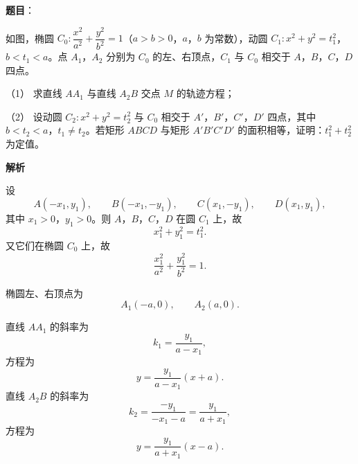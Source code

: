 \begin{answer}

\textbf{题目}：

如图，椭圆 $C_0:\dfrac{x^2}{a^2}+\dfrac{y^2}{b^2}=1$（$a>b>0$，$a$，$b$ 为常数），动圆 $C_1:x^2+y^2=t_1^2$，$b<t_1<a$。点 $A_1$，$A_2$ 分别为 $C_0$ 的左、右顶点，$C_1$ 与 $C_0$ 相交于 $A$，$B$，$C$，$D$ 四点。
\nopagebreak[4]
\begin{center}\end{center}
\nopagebreak[4]
（1） 求直线 $AA_1$ 与直线 $A_2B$ 交点 $M$ 的轨迹方程；

（2） 设动圆 $C_2:x^2+y^2=t_2^2$ 与 $C_0$ 相交于 $A'$，$B'$，$C'$，$D'$ 四点，其中 $b<t_2<a$，$t_1\neq t_2$。若矩形 $ABCD$ 与矩形 $A'B'C'D'$ 的面积相等，证明：$t_1^2+t_2^2$ 为定值。

\textbf{解析}


设
\nopagebreak[4]
\[A(-x_1,y_1),\qquad B(-x_1,-y_1),\qquad C(x_1,-y_1),\qquad D(x_1,y_1),\]
其中 $x_1>0$，$y_1>0$。则 $A$，$B$，$C$，$D$ 在圆 $C_1$ 上，故
\nopagebreak[4]
\[x_1^2+y_1^2=t_1^2.\]
又它们在椭圆 $C_0$ 上，故
\nopagebreak[4]
\[\frac{x_1^2}{a^2}+\frac{y_1^2}{b^2}=1.\]

椭圆左、右顶点为
\nopagebreak[4]
\[A_1(-a,0),\qquad A_2(a,0).\]

直线 $AA_1$ 的斜率为
\nopagebreak[4]
\[k_1=\frac{y_1}{a-x_1},\]
方程为
\nopagebreak[4]
\[y=\frac{y_1}{a-x_1}(x+a).\]
直线 $A_2B$ 的斜率为
\nopagebreak[4]
\[k_2=\frac{-y_1}{-x_1-a}=\frac{y_1}{a+x_1},\]
方程为
\nopagebreak[4]
\[y=\frac{y_1}{a+x_1}(x-a).\]


\end{answer}
